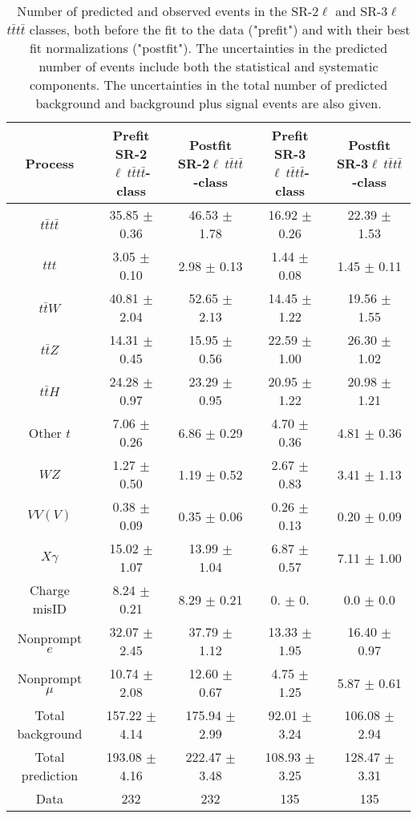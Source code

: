 \begin{table*}[!htp]
\centering
\caption{Number of predicted and observed events in the SR-2$\ell$ and SR-3$\ell$ $t\bar{t}t\bar{t}$ classes, both before the fit to the data ("prefit") and with their best fit normalizations ("postfit"). The uncertainties in the predicted number of events include both the statistical and systematic components. The uncertainties in the total number of predicted background and background plus signal events are also given.}
\label{tab:yields}
\renewcommand{\arraystretch}{1.2}
\begin{tabular}{ccccc}
Process & Prefit SR-2$\ell\ t\bar{t}t\bar{t}$-class & Postfit SR-2$\ell\ t\bar{t}t\bar{t}$-class & Prefit SR-3$\ell\ t\bar{t}t\bar{t}$-class & Postfit SR-3$\ell\ t\bar{t}t\bar{t}$-class \\
\hline
$t\bar{t}t\bar{t}$ & 35.85 $\pm$ 0.36 & 46.53 $\pm$ 1.78 & 16.92 $\pm$ 0.26 & 22.39 $\pm$ 1.53 \\
$ttt$ & 3.05 $\pm$ 0.10 & 2.98 $\pm$ 0.13 & 1.44 $\pm$ 0.08 & 1.45 $\pm$ 0.11 \\
$t\bar{t}W$ & 40.81 $\pm$ 2.04 & 52.65 $\pm$ 2.13 & 14.45 $\pm$ 1.22 & 19.56 $\pm$ 1.55 \\
$t\bar{t}Z$ & 14.31 $\pm$ 0.45 & 15.95 $\pm$ 0.56 & 22.59 $\pm$ 1.00 & 26.30 $\pm$ 1.02 \\
$t\bar{t}H$ & 24.28 $\pm$ 0.97 & 23.29 $\pm$ 0.95 & 20.95 $\pm$ 1.22 & 20.98 $\pm$ 1.21 \\
Other $t$ & 7.06 $\pm$ 0.26 & 6.86 $\pm$ 0.29 & 4.70 $\pm$ 0.36 & 4.81 $\pm$ 0.36 \\
$WZ$ & 1.27 $\pm$ 0.50 & 1.19 $\pm$ 0.52 & 2.67 $\pm$ 0.83 & 3.41 $\pm$ 1.13 \\
$VV(V)$ & 0.38 $\pm$ 0.09 & 0.35 $\pm$ 0.06 & 0.26 $\pm$ 0.13 & 0.20 $\pm$ 0.09 \\
$X\gamma$ & 15.02 $\pm$ 1.07 & 13.99 $\pm$ 1.04 & 6.87 $\pm$ 0.57 & 7.11 $\pm$ 1.00 \\
Charge misID & 8.24 $\pm$ 0.21 & 8.29 $\pm$ 0.21 & 0. $\pm$ 0. & 0.0 $\pm$ 0.0 \\
Nonprompt $e$ & 32.07 $\pm$ 2.45 & 37.79 $\pm$ 1.12 & 13.33 $\pm$ 1.95 & 16.40 $\pm$ 0.97 \\
Nonprompt $\mu$ & 10.74 $\pm$ 2.08 & 12.60 $\pm$ 0.67 & 4.75 $\pm$ 1.25 & 5.87 $\pm$ 0.61 \\
Total background & 157.22 $\pm$ 4.14 & 175.94 $\pm$ 2.99 & 92.01 $\pm$ 3.24 & 106.08 $\pm$ 2.94 \\
Total prediction & 193.08 $\pm$ 4.16 & 222.47 $\pm$ 3.48 & 108.93 $\pm$ 3.25 & 128.47 $\pm$ 3.31 \\
Data & 232 & 232 & 135 & 135 \\
\end{tabular}
\end{table*}